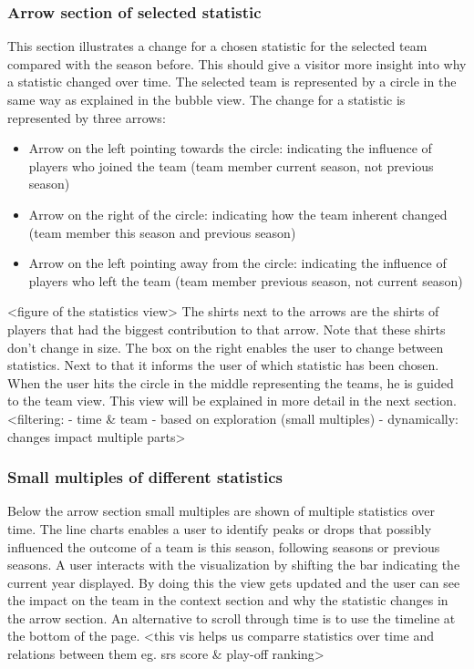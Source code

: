 \documentclass{sigchi}
\begin{document}
\subsubsection{Arrow section of selected statistic}
This section illustrates a change for a chosen statistic for the selected team compared with the season before. This should give a visitor more insight into why a statistic changed over time. The selected team is represented by a circle in the same way as explained in the bubble view. The change for a statistic is represented by three arrows:
\begin{itemize}
    \item Arrow on the left pointing towards the circle: indicating the influence of players who joined the team (team member current season, not previous season)
    \item Arrow on the right of the circle: indicating how the team inherent changed (team member this season and previous season)
    \item Arrow on the left pointing away from the circle: indicating the influence of players who left the team (team member previous season, not current season)
\end{itemize}
<figure of the statistics view>
The shirts next to the arrows are the shirts of players that had the biggest 
contribution to that arrow. Note that these shirts don't change in size. The box on 
the right enables the user to change between 
statistics. Next to that it informs the user of which statistic has been chosen. When 
the user hits the circle in the middle representing the teams, he is guided 
to the team view. This view will be explained in more detail in the next section.
<filtering: 
- time & team
- based on exploration (small multiples)
- dynamically: changes impact multiple parts>

\subsubsection{Small multiples of different statistics}
Below the arrow section small multiples are shown of multiple statistics over time. 
The line charts enables a user to identify peaks or drops that possibly influenced the 
outcome of a team is this season, following seasons or previous seasons. A user interacts with the visualization by shifting the bar indicating the current year displayed. By doing this the view gets updated and the user can see the impact on the team in the context section and why the statistic changes in the arrow section. An alternative to scroll through time is to use the timeline at the bottom of the page.
<this vis helps us comparre statistics over time and relations between them
eg. srs score & play-off ranking>
\end{document}
